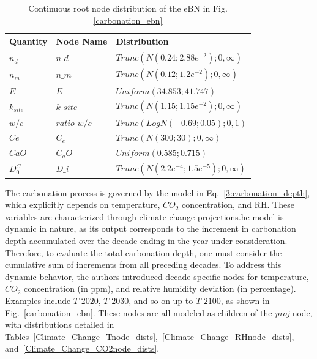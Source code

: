 \begin{table}[hbt!]
    \begin{center}
        \caption{Continuous root node distribution of the eBN in Fig.\ref{carbonation_ebn}}\label{continuous_root_node_ebn_carb}
        \begin{tabular}{P{1.6cm}P{2.1cm}P{6cm}}
            \textbf{Quantity} & \textbf{Node Name} & \textbf{Distribution} \\
            \midrule
            $n_d$       & $n \_ d$          & $Trunc(N(0.24;2.88e^{-2}); 0, \infty)$ \\
            $n_m$       & $n \_ m$          & $Trunc(N(0.12;1.2e^{-2}); 0, \infty)$\\
            $E$         & $E$               & $Uniform(34.853;41.747)$ \\
            $k_{site}$  & $k \_ site$       & $Trunc(N(1.15;1.15e^{-2}); 0, \infty)$ \\
            $w / c$     & $ratio \_ w/c$    & $Trunc(LogN(-0.69; 0.05); 0, 1)$ \\
            $Ce$        & $C_e$             & $Trunc(N(300;30); 0, \infty)$ \\
            $CaO$       & $C_aO$            & $Uniform(0.585; 0.715)$ \\
            $D_0^C$     & $D \_ i$          & $Trunc(N(2.2e^{-4};1.5e^{-5}); 0, \infty)$ \\
        \end{tabular}
    \end{center}
\end{table}
The carbonation process is governed by the model in Eq.~\ref{3:carbonation_depth}, which explicitly depends on temperature, $CO_2$ concentration, and RH. These variables are characterized through climate change projections.he model is dynamic in nature, as its output corresponds to the increment in carbonation depth accumulated over the decade ending in the year under consideration. Therefore, to evaluate the total carbonation depth, one must consider the cumulative sum of increments from all preceding decades.
To address this dynamic behavior, the authors introduced decade-specific nodes for temperature, $CO_2$ concentration (in ppm), and relative humidity deviation (in percentage). Examples include $T\_ {2020}$, $T\_ {2030}$, and so on up to $T\_ {2100}$, as shown in Fig.~\ref{carbonation_ebn}. These nodes are all modeled as children of the \textit{proj} node, with distributions detailed in Tables~\ref{Climate_Change_Tnode_dists},~\ref{Climate_Change_RHnode_dists}, and~\ref{Climate_Change_CO2node_dists}.
